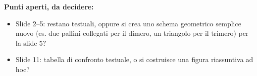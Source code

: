 \documentclass[11pt,a4paper]{article}
\begin{document}
\vspace{14pt}
\noindent\textbf{Punti aperti, da decidere:}
\begin{itemize}[nosep]
\item Slide 2--5: restano testuali, oppure si crea uno schema geometrico
      semplice nuovo (es. due pallini collegati per il dimero, un
      triangolo per il trimero) per la slide 5?
\item Slide 11: tabella di confronto testuale, o si costruisce una
      figura riassuntiva ad hoc?
\end{itemize}
\end{document}
